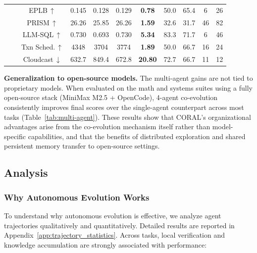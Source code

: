 \begin{table}[t]
\begin{threeparttable}
\begin{tabular}{c c c | >{}c ccc | cc | cc}
\midrule
{}
& 
& EPLB\,$\uparrow$                 & 0.145 & 0.128  & 0.129  & \textbf{0.78}  & 50.0   & 65.4 & 6   & 26  \\
& & PRISM\,$\uparrow$                & 26.26 & 25.85  & 26.26  & \textbf{1.59}  & 32.6 & 31.7 & 46  & 82  \\
& & LLM-SQL\,$\uparrow$              & 0.730 & 0.693  & 0.730  & \textbf{5.34}  & 83.3 & 71.7 & 6   & 46  \\
& & Txn Sched.\,$\uparrow$           & 4348 & 3704   & 3774   & \textbf{1.89}  & 50.0   & 66.7 & 16  & 24  \\
& & Cloudcast\,$\downarrow$          & 632.7 & 849.4  & 672.8  & \textbf{20.80} & 72.7 & 66.7 & 11  & 12  \\
\bottomrule
\end{tabular}
\end{threeparttable}
\end{table}

\textbf{Generalization to open-source models.}
The multi-agent gains are not tied to proprietary models. When evaluated on the math and systems suites using a fully open-source stack (MiniMax M2.5 + OpenCode), 4-agent co-evolution consistently improves final scores over the single-agent counterpart across most tasks (Table~\ref{tab:multi-agent}). These results show that CORAL's organizational advantages arise from the co-evolution mechanism itself rather than model-specific capabilities, and that the benefits of distributed exploration and shared persistent memory transfer to open-source settings.

 
\vspace{-4pt}
\subsection{Analysis}
\label{sec:exp_analysis}
\vspace{-4pt}

\subsubsection{Why Autonomous Evolution Works}
To understand why autonomous evolution is effective, we analyze agent trajectories qualitatively and quantitatively. Detailed results are reported in Appendix~\ref{app:trajectory_statistics}. Across tasks, local verification and knowledge accumulation are strongly associated with performance: 

